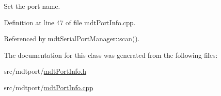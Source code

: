 Set the port name. 



Definition at line 47 of file mdt\-Port\-Info.\-cpp.



Referenced by mdt\-Serial\-Port\-Manager\-::scan().



The documentation for this class was generated from the following files\-:\begin{DoxyCompactItemize}
\item 
src/mdtport/\hyperlink{mdt_port_info_8h}{mdt\-Port\-Info.\-h}\item 
src/mdtport/\hyperlink{mdt_port_info_8cpp}{mdt\-Port\-Info.\-cpp}\end{DoxyCompactItemize}
